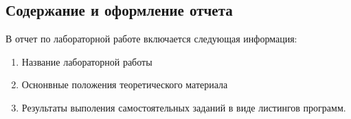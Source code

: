 \documentclass[a4paper,report,14pt]{ncc}
\begin{document}
% 
%  
% 
% 
\subsection{Содержание и оформление отчета}

В отчет по лабораторной работе включается следующая информация:

\begin{enumerate}
 \item Название лабораторной работы
 \item Оснонвные положения теоретического материала
 \item Результаты выполения самостоятельных заданий в виде листингов программ.
\end{enumerate}
\end{document}
